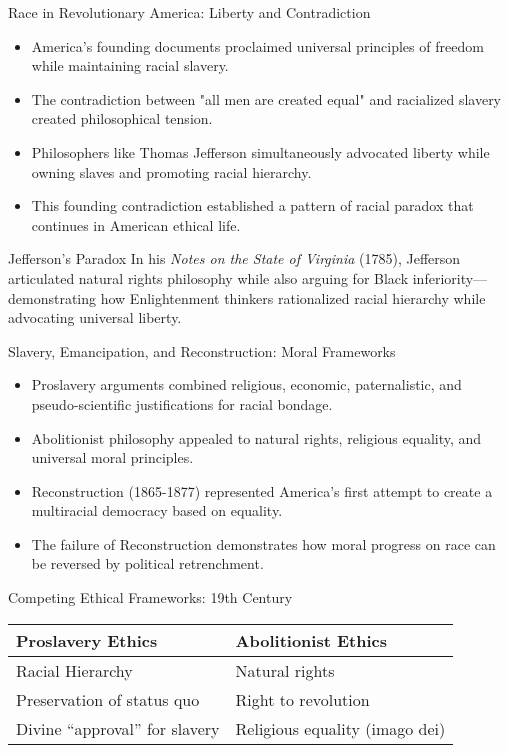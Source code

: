 \documentclass{beamer}
\begin{document}
	\begin{frame}{Race in Revolutionary America: Liberty and Contradiction}
		\begin{itemize}
			\item America's founding documents proclaimed universal principles of freedom while maintaining racial slavery.
			\item The contradiction between "all men are created equal" and racialized slavery created philosophical tension.
			\item Philosophers like Thomas Jefferson simultaneously advocated liberty while owning slaves and promoting racial hierarchy.
			\item This founding contradiction established a pattern of racial paradox that continues in American ethical life.
		\end{itemize}
		
		\begin{exampleblock}{Jefferson's Paradox}
			In his \textit{Notes on the State of Virginia} (1785), Jefferson articulated natural rights philosophy while also arguing for Black inferiority—demonstrating how Enlightenment thinkers rationalized racial hierarchy while advocating universal liberty.
		\end{exampleblock}
	\end{frame}
	
	\begin{frame}{Slavery, Emancipation, and Reconstruction: Moral Frameworks}
		\begin{itemize}
			\item Proslavery arguments combined religious, economic, paternalistic, and pseudo-scientific justifications for racial bondage.
			\item Abolitionist philosophy appealed to natural rights, religious equality, and universal moral principles.
			\item Reconstruction (1865-1877) represented America's first attempt to create a multiracial democracy based on equality.
			\item The failure of Reconstruction demonstrates how moral progress on race can be reversed by political retrenchment.
		\end{itemize}
		
		\begin{alertblock}{Competing Ethical Frameworks: 19th Century}
			\begin{tabular}{|l|l|}
				\hline
				\textbf{Proslavery Ethics} & \textbf{Abolitionist Ethics} \\
				\hline
				Racial Hierarchy & Natural rights \\
				Preservation of status quo & Right to revolution\\
				Divine ``approval'' for slavery & Religious equality (imago dei) \\
				\hline
			\end{tabular}
		\end{alertblock}
	\end{frame}
	
\end{document}
